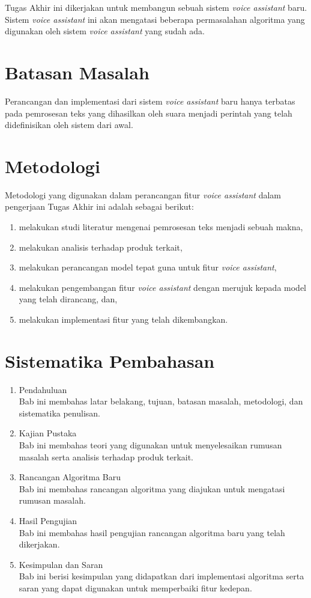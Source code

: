 Tugas Akhir ini dikerjakan untuk membangun sebuah sistem \textit{voice assistant} baru. Sistem \textit{voice assistant} ini akan mengatasi beberapa permasalahan algoritma yang digunakan oleh sistem \textit{voice assistant} yang sudah ada.

\section{Batasan Masalah}

Perancangan dan implementasi dari sistem \textit{voice assistant} baru hanya terbatas pada pemrosesan teks yang dihasilkan oleh suara menjadi perintah yang telah didefinisikan oleh sistem dari awal.

\section{Metodologi}

Metodologi yang digunakan dalam perancangan fitur \textit{voice assistant} dalam pengerjaan Tugas Akhir ini adalah sebagai berikut:

\begin{enumerate}
	\item melakukan studi literatur mengenai pemrosesan teks menjadi sebuah makna,
	\item melakukan analisis terhadap produk terkait,
	\item melakukan perancangan model tepat guna untuk fitur \textit{voice assistant},
	\item melakukan pengembangan fitur \textit{voice assistant} dengan merujuk kepada model yang telah dirancang, dan,
	\item melakukan implementasi fitur yang telah dikembangkan. 
\end{enumerate}

\section{Sistematika Pembahasan}

\begin{enumerate}[label=Bab \arabic*,itemindent=*]
	\item Pendahuluan\\
	Bab ini membahas latar belakang, tujuan, batasan masalah, metodologi, dan sistematika penulisan.
	\item Kajian Pustaka\\
	Bab ini membahas teori yang digunakan untuk menyelesaikan rumusan masalah serta analisis terhadap produk terkait.
	\item Rancangan Algoritma Baru\\
	Bab ini membahas rancangan algoritma yang diajukan untuk mengatasi rumusan masalah.
	\item Hasil Pengujian\\
	Bab ini membahas hasil pengujian rancangan algoritma baru yang telah dikerjakan.
	\item Kesimpulan dan Saran\\
	Bab ini berisi kesimpulan yang didapatkan dari implementasi algoritma serta saran yang dapat digunakan untuk memperbaiki fitur kedepan.
\end{enumerate}
